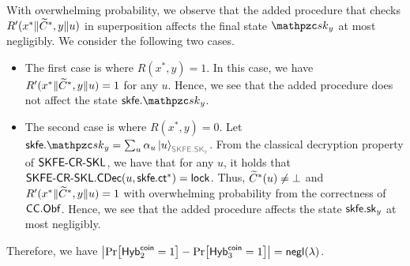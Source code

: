 With overwhelming probability, we observe that the added procedure that checks
$R^\prime(x^* \| \widetilde{C}^*,y \| u)$ in superposition affects the final state $\qsk_y$ at most negligibly.
We consider the following two cases.
\begin{itemize}
\item The first case is where $R(x^*,y)=1$. In this case, we have
    $R^\prime(x^*\|\widetilde{C}^*,y\|u)=1$ for any $u$.
Hence, we see that the added procedure does not affect the state $\skfe.\qsk_y$.
\item The second case is where $R(x^*,y)=0$. Let
$\skfe.\qsk_y=\sum_u \alpha_u \ket{u}_{\qreg{SKFE.SK_y}}$. From
the classical decryption property of $\mathsf{SKFE}\textrm{-}\mathsf{CR}\textrm{-}\mathsf{SKL}$, we have that for
any $u$, it holds that
$\mathsf{SKFE}\textrm{-}\mathsf{CR}\textrm{-}\mathsf{SKL}.\mathsf{CDec}(u,\mathsf{skfe}.\mathsf{ct}^*)=\mathsf{lock}$. Thus, $\widetilde{C}^*(u)\ne\bot$ and
$R^\prime(x^*\|\widetilde{C}^*,y\|u)=1$ with overwhelming probability from
the correctness of $\mathsf{CC}.\mathsf{Obf}$. Hence, we see that the added procedure affects the state $\mathsf{skfe}.\mathsf{sk}_y$ at most negligibly.
\end{itemize}
Therefore, we have $\abs{\Pr[\mathsf{Hyb}_{2}^{\mathsf{coin}}=1]-\Pr[\mathsf{Hyb}_{3}^{\mathsf{coin}}=1]}={\mathsf{negl}}(\lambda)$.

